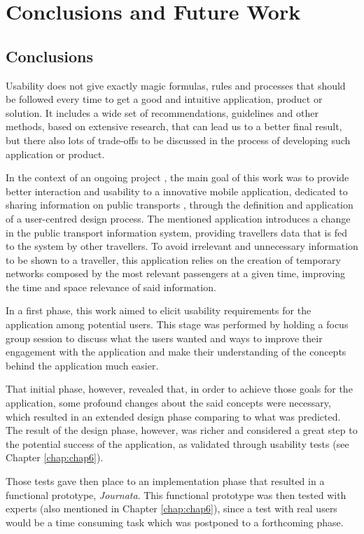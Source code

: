 \chapter{Conclusions and Future Work} \label{chap:chap7}

\section{Conclusions}

Usability does not give exactly magic formulas, rules and processes that should be followed every time to get a good and intuitive application, product or solution.
It includes a wide set of recommendations, guidelines and other methods, based on extensive research, that can lead us to a better final result, but there also lots of trade-offs to be discussed in the process of developing such application or product.

In the context of an ongoing project \cite{kn:NGeCP11}, the main goal of this work was to provide better interaction and usability to a innovative mobile application, dedicated to sharing information on public transports \cite{kn:eSG12}, through the definition and application of a user-centred design process. The mentioned application introduces a change in the public transport information system, providing travellers data that is fed to the system by other travellers. To avoid irrelevant and unnecessary information to be shown to a traveller, this application relies on the creation of temporary networks composed by the most relevant passengers at a given time, improving the time and space relevance of said information.

In a first phase, this work aimed to elicit usability requirements for the application among potential users. This stage was performed by holding a focus group session to discuss what the users wanted and ways to improve their engagement with the application and make their understanding of the concepts behind the application much easier.

That initial phase, however, revealed that, in order to achieve those goals for the application, some profound changes about the said concepts were necessary, which resulted in an extended design phase comparing to what was predicted. 
The result of the design phase, however, was richer and considered a great step to the potential success of the application, as validated through usability tests (see Chapter \ref{chap:chap6}).

Those tests gave then place to an implementation phase that resulted in a functional prototype, \emph{Journata}. This functional prototype was then tested with experts (also mentioned in Chapter \ref{chap:chap6}), since a test with real users would be a time consuming task which was postponed to a forthcoming phase. 

